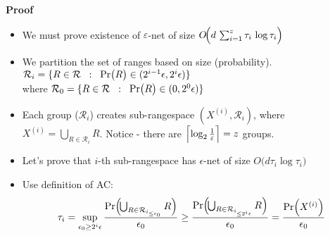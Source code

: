 \documentclass{beamer}
\begin{document}
\begin{frame}{\textbf{Proof}}
\begin{itemize}
  \item We must prove existence of $\varepsilon$-net of size
   \( O\!\Bigl(d\,\sum_{i=1}^{z} \tau_i\,\log\tau_i\Bigr) \)
  \vspace{0.2cm}
  \item We partition the set of ranges based on size (probability).\\
  $\mathcal{R}_i = \{R \in \mathcal{R} \hspace{0.2cm} : \hspace{0.2cm} \Pr \bigl (R \bigr) \in (2^{i-1}\epsilon,2^i\epsilon)\}$\\
  where $\mathcal{R}_0 = \{R \in \mathcal{R} \hspace{0.2cm} : \hspace{0.2cm} \Pr \bigl (R \bigr) \in (0,2^0\epsilon)\}$
  \vspace{0.2cm}
  \item Each group (\(\mathcal{R}_i\)) creates sub-rangespace \( (X^{(i)},\mathcal{R}_i) \), where $X^{(i)}=\bigcup_{R \in \mathcal{R}_i}R$. \hspace{0.2cm} Notice - there are  \(\Bigl\lceil \log_2\frac{1}{\varepsilon}\Bigr\rceil = z\) groups.
  \item Let's prove that $i$-th sub-rangespace has $\epsilon$-net of size \( O\bigl ( d \tau_i \log \tau_i\bigr )\) 
  \item Use definition of AC: \[
\tau_i =
\sup_{\epsilon_0 \ge 2^i\epsilon}
\frac{
  \Pr\Bigl(\!\bigcup_{R \in \mathcal{R}_{i_{\le \epsilon_0}}} R\Bigr)
}{\epsilon_0}
\geq
\frac{
  \Pr\Bigl(\!\bigcup_{R \in \mathcal{R}_{i_{\le 2^i\epsilon}}} R\Bigr)
}{\epsilon_0}
=
\frac{
  \Pr\Bigl(X^{(i)}\Bigr)
}{\epsilon_0}
\]
  
\end{itemize}

\end{frame}
\end{document}

